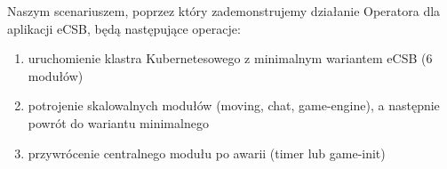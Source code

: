 \documentclass[polish]{aghengthesis}
\begin{document}
Naszym scenariuszem, poprzez który zademonstrujemy działanie Operatora dla aplikacji eCSB, będą następujące operacje:

\begin{enumerate}
    \item uruchomienie klastra Kubernetesowego z minimalnym wariantem eCSB (6 modułów)
    \item potrojenie skalowalnych modułów (moving, chat, game-engine), a następnie powrót do wariantu minimalnego
    \item przywrócenie centralnego modułu po awarii (timer lub game-init)
\end{enumerate}


\chapter{\ChapterTitleSolutionArchitecture}
\label{sec:architektura}

\chapter{\ChapterTitleEnvConfig}
\label{sec:konfiguracja-srodowiska}

\chapter{\ChapterTitleInstallMethod}
\label{sec:instalacja}


\chapter{\ChapterTitleSolutionSteps}
\label{sec:odtworzenie}

\chapter{\ChapterTitleDemoDeployment}
\label{sec:deployment}

\chapter{\ChapterTitleSummary}
\label{sec:podsumowanie}
\end{document}

